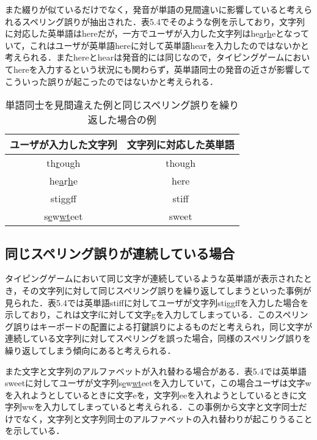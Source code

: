また綴りが似ているだけでなく，発音が単語の見間違いに影響していると考えられるスペリング誤りが抽出された．表5.4でそのような例を示しており，文字列に対応した英単語はhereだが，一方でユーザが入力した文字列はhe\underline{a}r\underline{h}eとなっていて，これはユーザが英単語hereに対して英単語hearを入力したのではないかと考えられる．またhereとhearは発音的には同じなので，タイピングゲームにおいてhereを入力するという状況にも関わらず，英単語同士の発音の近さが影響してこういった誤りが起こったのではないかと考えられる．

 \begin{table*}[!t]
  \small
  \begin{center}
   \caption{単語同士を見間違えた例と同じスペリング誤りを繰り返した場合の例}
   \begin{tabular}{|c|c|} \hline
       	ユーザが入力した文字列 & 文字列に対応した英単語\\ \hline
	    th\underline{r}ough & though\\ \hline
	    he\underline{a}r\underline{h}e & here\\ \hline
	    sti\underline{gg}ff & stiff\\ \hline
	    s\underline{e}w\underline{wt}eet & sweet\\ \hline
   \end{tabular}
  \end{center}
 \end{table*}

\subsection{同じスペリング誤りが連続している場合}
タイピングゲームにおいて同じ文字が連続しているような英単語が表示されたとき，その文字列に対して同じスペリング誤りを繰り返してしまうといった事例が見られた．表5.4では英単語stiffに対してユーザが文字列sti\underline{gg}ffを入力した場合を示しており，これは文字fに対して文字gを入力してしまっている．このスペリング誤りはキーボードの配置による打鍵誤りによるものだと考えられ，同じ文字が連続している文字列に対してスペリングを誤った場合，同様のスペリング誤りを繰り返してしまう傾向にあると考えられる．

また文字と文字列のアルファベットが入れ替わる場合がある．表5.4では英単語sweetに対してユーザが文字列s\underline{e}w\underline{wt}eetを入力していて，この場合ユーザは文字wを入れようとしているときに文字eを，文字列eeを入れようとしているときに文字列wwを入力してしまっていると考えられる．この事例から文字と文字同士だけでなく，文字列と文字列同士のアルファベットの入れ替わりが起こりうることを示している．
